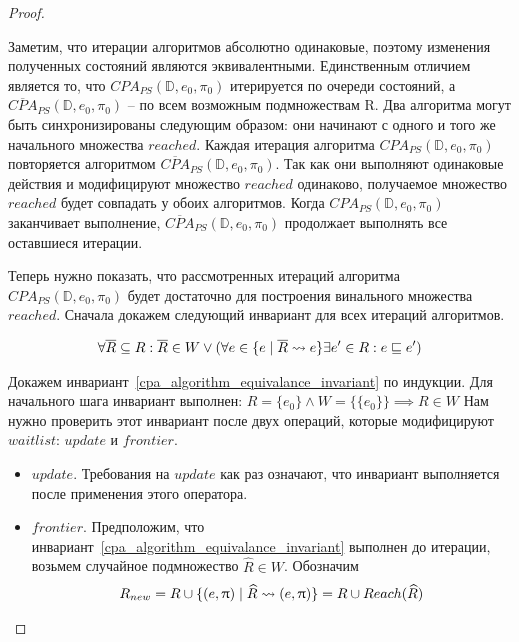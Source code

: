 \begin{proof}
\begin{enumerate}
Заметим, что итерации алгоритмов абсолютно одинаковые, поэтому изменения полученных состояний являются эквивалентными.
Единственным отличием является то, что $CPA_{PS}(\mathbb{D}, e_0, \pi_0)$ итерируется по очереди состояний, а $\overline{CPA}_{PS}(\mathbb{D}, e_0, \pi_0)$ -- по всем возможным подмножествам R.
Два алгоритма могут быть синхронизированы следующим образом: они начинают с одного и того же начального множества $reached$. 
Каждая итерация алгоритма $CPA_{PS}(\mathbb{D}, e_0, \pi_0)$ повторяется алгоритмом $\overline{CPA}_{PS}(\mathbb{D}, e_0, \pi_0)$. 
Так как они выполняют одинаковые действия и модифицируют множество $reached$ одинаково, получаемое множество $reached$ будет совпадать у обоих алгоритмов.
Когда $CPA_{PS}(\mathbb{D}, e_0, \pi_0)$ заканчивает выполнение, $\overline{CPA}_{PS}(\mathbb{D}, e_0, \pi_0)$ продолжает выполнять все оставшиеся итерации.

Теперь нужно показать, что рассмотренных итераций алгоритма $CPA_{PS}(\mathbb{D}, e_0, \pi_0)$ будет достаточно для построения винального множества $reached$.
Сначала докажем следующий инвариант для всех итераций алгоритмов.

\begin{equation}
\label{cpa_algorithm_equivalance_invariant}
\begin{aligned}
\forall \overline{R} \subseteq R: \overline{R} \in W \lor (\forall e \in \{e \mid \overline{R} \leadsto e\} \exists e' \in R : e \sqsubseteq e') 
\end{aligned}
\end{equation}

Докажем инвариант~\ref{cpa_algorithm_equivalance_invariant} по индукции.
Для начального шага инвариант выполнен: $R = \{e_0\} \land W = \{\{e_0\}\} \implies R \in W$
Нам нужно проверить этот инвариант после двух операций, которые модифицируют $waitlist$: $update$ и $frontier$.

\begin{itemize}
\item $update$. Требования на $update$ как раз означают, что инвариант выполняется после применения этого оператора.

\item $frontier$. Предположим, что инвариант~\ref{cpa_algorithm_equivalance_invariant} выполнен до итерации, возьмем случайное подмножество $\widehat{R} \in W$. 
Обозначим
\begin{equation}
\label{r_new_definition}
\begin{aligned}
R_{new} = R \cup \{(e, \uppi) \mid \widehat{R} \leadsto (e, \uppi)\} = R \cup Reach(\widehat{R})
\end{aligned}
\end{equation}


\end{itemize}
\end{enumerate}
\end{proof}
